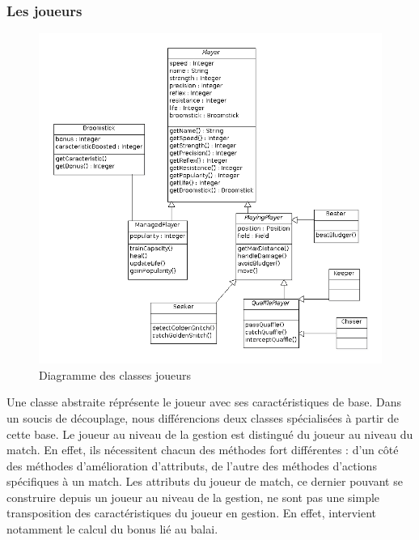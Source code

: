 \documentclass[a4paper,titlepage]{scrreprt}
\begin{document}
  \subsubsection{Les joueurs}
    \begin{figure}[H]
    \center
    \includegraphics[scale=0.4]{uml/class/DiagrammedeclassesJoueurs.png}
    \caption{Diagramme des classes joueurs}
  \end{figure}	
    Une classe abstraite réprésente le \gls{joueur} avec ses caractéristiques de base.
    Dans un soucis de découplage, nous différencions deux classes spécialisées à partir de cette base.
    Le joueur au niveau de la gestion est distingué du joueur au niveau du match.
    En effet, ils nécessitent chacun des méthodes fort différentes :
    d'un côté des méthodes d'amélioration d'attributs,
    de l'autre des méthodes d'actions spécifiques à un match.
    Les attributs du joueur de match, ce dernier pouvant se construire depuis un joueur
    au niveau de la gestion, ne sont pas une simple transposition des caractéristiques
    du joueur en gestion. En effet, intervient notamment le calcul du bonus lié au balai.
\end{document}
